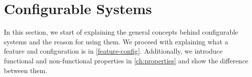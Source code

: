\section{Configurable Systems}\label{ch:configurable-systems}
\theoremstyle{definition}
\newtheorem{definition}{Definition}[section]

In this section, we start of explaining the general concepts behind configurable systems and the reason for using them. 
We proceed with explaining what a feature and configuration is in \autoref{feature-config}. 
Additionally, we introduce functional and non-functional properties in \autoref{ch:properties} and show the difference between them.



